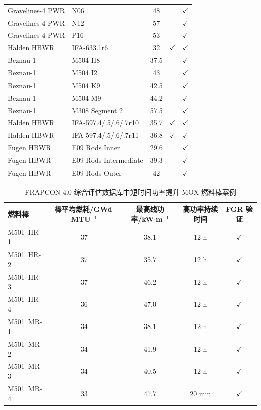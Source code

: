 \begin{xltabular}{\textwidth}{lXccc}
	Gravelines-4 PWR & N06 & 48 &  & $\checkmark$ \\
	Gravelines-4 PWR & N12 & 57 &  & $\checkmark$ \\
	Gravelines-4 PWR & P16 & 53 &  & $\checkmark$ \\
	
	Halden HBWR & IFA-633.1r6 & 32 & $\checkmark$ & $\checkmark$ \\
	
	Beznau-1 & M504 H8 & 37.5 &  & $\checkmark$ \\
	Beznau-1 & M504 I2 & 43 &  & $\checkmark$ \\
	Beznau-1 & M504 K9 & 42.5 &  & $\checkmark$ \\
	Beznau-1 & M504 M9 & 44.2 &  & $\checkmark$ \\
	
	Beznau-1 & M308 Segment 2 & 57.5 &  & $\checkmark$ \\
	
	Halden HBWR & IFA-597.4/.5/.6/.7r10 & 35.7 & $\checkmark$ & $\checkmark$ \\
	Halden HBWR & IFA-597.4/.5/.6/.7r11 & 36.8 & $\checkmark$ & $\checkmark$ \\
	
	Fugen HBWR & E09 Rods Inner & 29.6 &  & $\checkmark$ \\
	Fugen HBWR & E09 Rods Intermediate & 39.3 &  & $\checkmark$ \\
	Fugen HBWR & E09 Rods Outer & 42 &  & $\checkmark$ \\
	
\end{xltabular}

\begin{table}[H]
	\centering
	\caption{FRAPCON-4.0 综合评估数据库中短时间功率提升 MOX 燃料棒案例}
	\label{tab:frapcon_mox_power_ramp_cases}
	\begin{tabularx}{\textwidth}{X c c c c}
		\toprule
		燃料棒 &
		棒平均燃耗/GWd$\cdot$MTU$^{-1}$ &
		最高线功率/kW$\cdot$m$^{-1}$ &
		高功率持续时间 & FGR 验证 \\
		\midrule
		
		\mbox{M501 HR-1} & 37 & 38.1 & 12 h & $\checkmark$ \\
		\mbox{M501 HR-2} & 37 & 35.7 & 12 h & $\checkmark$ \\
		\mbox{M501 HR-3} & 37 & 46.2 & 12 h & $\checkmark$ \\
		\mbox{M501 HR-4} & 36 & 47.0 & 12 h & $\checkmark$ \\
		
		\mbox{M501 MR-1} & 34 & 38.1 & 12 h & $\checkmark$ \\
		\mbox{M501 MR-2} & 34 & 41.9 & 12 h & $\checkmark$ \\
		\mbox{M501 MR-3} & 34 & 40.5 & 12 h & $\checkmark$ \\
		\mbox{M501 MR-4} & 33 & 41.7 & 20 min & $\checkmark$ \\
		
		\bottomrule
	\end{tabularx}
\end{table}

